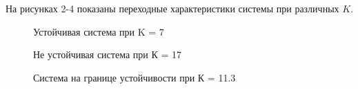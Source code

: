 \documentclass[a4paper, 11pt]{article}
\begin{document}
	На рисунках 2-4 показаны переходные характеристики системы при различных $K$. 
	\begin{figure}[h!]
				\caption{Устойчивая система при K = 7}
		\label{2}
	\end{figure}
	\begin{figure}[h!]
		\caption{Не устойчивая система при К = 17}
		\label{3}
	\end{figure}

\newpage

	\begin{figure}[h!]
		\caption{Система на границе устойчивости при К = 11.3}
		\label{11_3}
	\end{figure}
		
\end{document}
